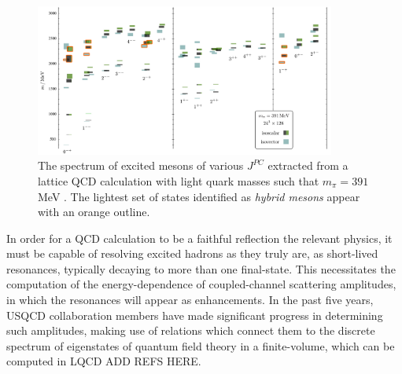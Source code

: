\begin{figure}
\includegraphics[width=0.88\textwidth]{figures/isoscalar}
\caption{The spectrum of excited mesons of various $J^{PC}$ extracted from a lattice QCD calculation with light quark masses such that $m_\pi = 391$ MeV \cite{Dudek:2013yja}. The lightest set of states identified as \emph{hybrid mesons} appear with an orange outline.}
\label{spectrum}
\end{figure}

In order for a QCD calculation to be a faithful reflection the relevant physics, it must be capable of resolving excited hadrons as they truly are, as short-lived resonances, typically decaying to more than one final-state. This necessitates the computation of the energy-dependence of coupled-channel scattering amplitudes, in which the resonances will appear as enhancements. In the past five years, USQCD collaboration members have made significant progress in determining such amplitudes, making use of relations which connect them to the discrete spectrum of eigenstates of quantum field theory in a finite-volume, which can be computed in LQCD  \cite{Luscher:1986pf,Luscher:1990ck} {\color{red} ADD REFS HERE}.

